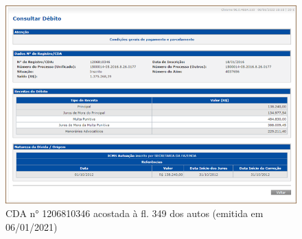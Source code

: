 \begin{figure}
    \includegraphics[width=1\textwidth]{Imagens/CDA n 1206810346 acostada a fl. 349 dos autos.png}
    \caption{CDA n° 1206810346 acostada à fl. 349 dos autos (emitida em 06/01/2021)}
    \label{fig:my_label}
\end{figure}



